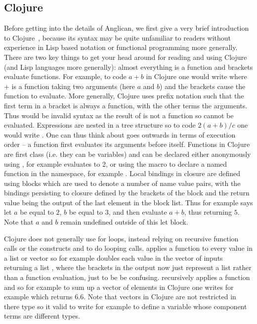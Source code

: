 \subsection{Clojure}
\label{sec:probprog:anglican:clojure} 

Before getting into the details of Anglican, we first give a very brief introduction to Clojure~\citep{hickey2008clojure},
because its syntax may be quite unfamiliar to readers without experience in Lisp based notation or functional programming
more generally.  There are two key things to get your head around for reading and using Clojure (and Lisp languages more
generally): almost everything is a function and brackets evaluate functions.  For example, to code $a+b$ in Clojure one
would write {\small {}} where $+$ is a function taking two arguments (here $a$ and $b$) and the brackets cause the
function to evaluate.  More generally, Clojure uses prefix notation such that 
the first term in a bracket is always a function, with the other terms the arguments.
Thus {\small {}} would be invalid syntax as the result of {\small {}}  is not a function so cannot be evaluated.
Expressions are nested in a tree structure so to code $2(a+b)/c$ one would write {\small {}} .  One can
thus think about goes outwards in terms of execution order -- a function first evaluates its arguments before
itself.  Functions in Clojure are first class (i.e. they can be variables) and can be declared either anonymously using
{\small {}}, for example {\small {}} evaluates to 2, or using the
macro  to declare a named function in the namespace, for example {\small {}}.
Local bindings in closure are defined using \cllet blocks which are used to denote a number of name value
pairs, with the bindings persisting to closure defined by the brackets of the \cllet block and the return value
being the output of the last element in the \cllet block list.  Thus for example
{\small {}} says let $a$ be equal to $2$, $b$ be equal to $3$, and then evaluate $a+b$, thus
returning $5$.  Note that $a$ and $b$ remain undefined outside of this let block.  

Clojure does not generally use
for loops, instead relying on recursive function calls or the constructs \map and \reduce to do looping calls.
\map applies a function to every value in a list or vector so for example {\small {}}
doubles each value in the vector of inputs returning a list {\small {}}, where the brackets in the output
now just represent a list rather than a function evaluation, just to be be confusing.  \reduce recursively applies
a function and so for example to sum up a vector of elements in Clojure one writes for example
{\small {}} which returns $6.6$.  Note that vectors in Clojure are not restricted in
there type so it valid to write for example {\small {}} to define a variable 
{\small {}} whose component terms are different types.

